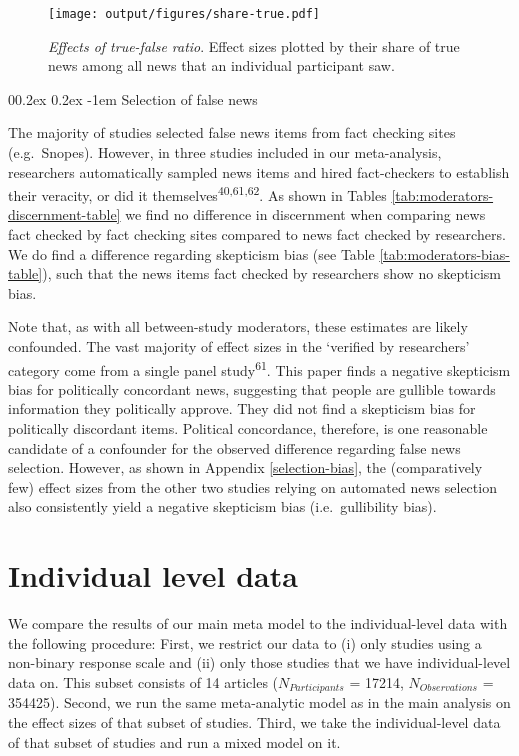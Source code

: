 \documentclass[
  man]{apa6}
\makeatletter
\let\oldparagraph\paragraph
\renewcommand{\paragraph}{
    \@ifstar
      \xxxParagraphStar
      \xxxParagraphNoStar
  }
\newcommand{\xxxParagraphStar}[1]{\oldparagraph*{#1}\mbox{}}
\newcommand{\xxxParagraphNoStar}[1]{\oldparagraph{#1}\mbox{}}
\renewcommand{\paragraph}{\@startsection{paragraph}{4}{\parindent}%
  {0\baselineskip \@plus 0.2ex \@minus 0.2ex}%
  {-1em}%
  {\normalfont\normalsize\bfseries\itshape\typesectitle}}
\makeatother
\begin{document}
\begin{figure}
\centering
\texttt{[image: output/figures/share-true.pdf]}
\caption{\label{fig:share-true}\emph{Effects of true-false ratio}. Effect sizes plotted by their share of true news among all news that an individual participant saw.}
\end{figure}

\paragraph{Selection of false news}\label{selection-of-false-news}

The majority of studies selected false news items from fact checking sites (e.g.~Snopes). However, in three studies included in our meta-analysis, researchers automatically sampled news items and hired fact-checkers to establish their veracity, or did it themselves\textsuperscript{40,61,62}. As shown in Tables \ref{tab:moderators-discernment-table} we find no difference in discernment when comparing news fact checked by fact checking sites compared to news fact checked by researchers. We do find a difference regarding skepticism bias (see Table \ref{tab:moderators-bias-table}), such that the news items fact checked by researchers show no skepticism bias.

Note that, as with all between-study moderators, these estimates are likely confounded. The vast majority of effect sizes in the `verified by researchers' category come from a single panel study\textsuperscript{61}. This paper finds a negative skepticism bias for politically concordant news, suggesting that people are gullible towards information they politically approve. They did not find a skepticism bias for politically discordant items. Political concordance, therefore, is one reasonable candidate of a confounder for the observed difference regarding false news selection. However, as shown in Appendix \ref{selection-bias}, the (comparatively few) effect sizes from the other two studies relying on automated news selection also consistently yield a negative skepticism bias (i.e.~gullibility bias).

\clearpage

\section{Individual level data}\label{individual-level}

\FloatBarrier

We compare the results of our main meta model to the individual-level data with the following procedure: First, we restrict our data to (i) only studies using a non-binary response scale and (ii) only those studies that we have individual-level data on. This subset consists of 14 articles (\(N_{Participants}\) = 17214, \(N_{Observations}\) = 354425). Second, we run the same meta-analytic model as in the main analysis on the effect sizes of that subset of studies. Third, we take the individual-level data of that subset of studies and run a mixed model on it.
\end{document}
